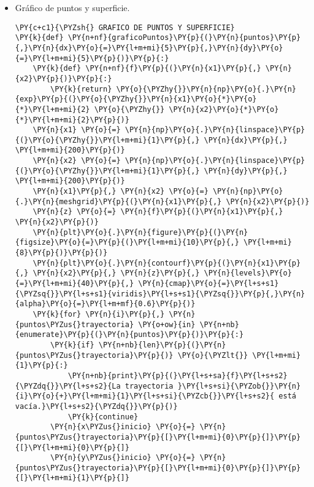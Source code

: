 \begin{itemize}
\item Gráfico de puntos y superficie.
    \begin{tcolorbox}[breakable, size=fbox, boxrule=1pt, pad at break*=1mm,colback=cellbackground, colframe=cellborder]
\begin{Verbatim}[commandchars=\\\{\}]
\PY{c+c1}{\PYZsh{} GRAFICO DE PUNTOS Y SUPERFICIE}
\PY{k}{def} \PY{n+nf}{graficoPuntos}\PY{p}{(}\PY{n}{puntos}\PY{p}{,}\PY{n}{dx}\PY{o}{=}\PY{l+m+mi}{5}\PY{p}{,}\PY{n}{dy}\PY{o}{=}\PY{l+m+mi}{5}\PY{p}{)}\PY{p}{:}
    \PY{k}{def} \PY{n+nf}{f}\PY{p}{(}\PY{n}{x1}\PY{p}{,} \PY{n}{x2}\PY{p}{)}\PY{p}{:}
        \PY{k}{return} \PY{o}{\PYZhy{}}\PY{n}{np}\PY{o}{.}\PY{n}{exp}\PY{p}{(}\PY{o}{\PYZhy{}}\PY{n}{x1}\PY{o}{*}\PY{o}{*}\PY{l+m+mi}{2} \PY{o}{\PYZhy{}} \PY{n}{x2}\PY{o}{*}\PY{o}{*}\PY{l+m+mi}{2}\PY{p}{)}
    \PY{n}{x1} \PY{o}{=} \PY{n}{np}\PY{o}{.}\PY{n}{linspace}\PY{p}{(}\PY{o}{\PYZhy{}}\PY{l+m+mi}{1}\PY{p}{,} \PY{n}{dx}\PY{p}{,} \PY{l+m+mi}{200}\PY{p}{)}
    \PY{n}{x2} \PY{o}{=} \PY{n}{np}\PY{o}{.}\PY{n}{linspace}\PY{p}{(}\PY{o}{\PYZhy{}}\PY{l+m+mi}{1}\PY{p}{,} \PY{n}{dy}\PY{p}{,} \PY{l+m+mi}{200}\PY{p}{)}
    \PY{n}{x1}\PY{p}{,} \PY{n}{x2} \PY{o}{=} \PY{n}{np}\PY{o}{.}\PY{n}{meshgrid}\PY{p}{(}\PY{n}{x1}\PY{p}{,} \PY{n}{x2}\PY{p}{)}
    \PY{n}{z} \PY{o}{=} \PY{n}{f}\PY{p}{(}\PY{n}{x1}\PY{p}{,} \PY{n}{x2}\PY{p}{)}
    \PY{n}{plt}\PY{o}{.}\PY{n}{figure}\PY{p}{(}\PY{n}{figsize}\PY{o}{=}\PY{p}{(}\PY{l+m+mi}{10}\PY{p}{,} \PY{l+m+mi}{8}\PY{p}{)}\PY{p}{)}
    \PY{n}{plt}\PY{o}{.}\PY{n}{contourf}\PY{p}{(}\PY{n}{x1}\PY{p}{,} \PY{n}{x2}\PY{p}{,} \PY{n}{z}\PY{p}{,} \PY{n}{levels}\PY{o}{=}\PY{l+m+mi}{40}\PY{p}{,} \PY{n}{cmap}\PY{o}{=}\PY{l+s+s1}{\PYZsq{}}\PY{l+s+s1}{viridis}\PY{l+s+s1}{\PYZsq{}}\PY{p}{,}\PY{n}{alpha}\PY{o}{=}\PY{l+m+mf}{0.6}\PY{p}{)}
    \PY{k}{for} \PY{n}{i}\PY{p}{,} \PY{n}{puntos\PYZus{}trayectoria} \PY{o+ow}{in} \PY{n+nb}{enumerate}\PY{p}{(}\PY{n}{puntos}\PY{p}{)}\PY{p}{:}
        \PY{k}{if} \PY{n+nb}{len}\PY{p}{(}\PY{n}{puntos\PYZus{}trayectoria}\PY{p}{)} \PY{o}{\PYZlt{}} \PY{l+m+mi}{1}\PY{p}{:}
            \PY{n+nb}{print}\PY{p}{(}\PY{l+s+sa}{f}\PY{l+s+s2}{\PYZdq{}}\PY{l+s+s2}{La trayectoria }\PY{l+s+si}{\PYZob{}}\PY{n}{i}\PY{o}{+}\PY{l+m+mi}{1}\PY{l+s+si}{\PYZcb{}}\PY{l+s+s2}{ está vacía.}\PY{l+s+s2}{\PYZdq{}}\PY{p}{)}
            \PY{k}{continue}
        \PY{n}{x\PYZus{}inicio} \PY{o}{=} \PY{n}{puntos\PYZus{}trayectoria}\PY{p}{[}\PY{l+m+mi}{0}\PY{p}{]}\PY{p}{[}\PY{l+m+mi}{0}\PY{p}{]}
        \PY{n}{y\PYZus{}inicio} \PY{o}{=} \PY{n}{puntos\PYZus{}trayectoria}\PY{p}{[}\PY{l+m+mi}{0}\PY{p}{]}\PY{p}{[}\PY{l+m+mi}{1}\PY{p}{]}

\end{Verbatim}
\end{tcolorbox}
\end{itemize}
